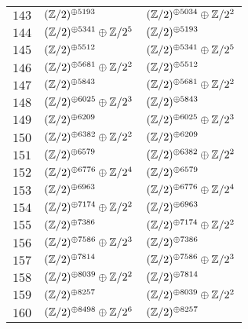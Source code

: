 \begin{supertabular}{|c|p{5.5cm}|p{5.5cm}|}
$143$%
&$(\mathbb{Z}/2)^{\oplus5193}$%
&$(\mathbb{Z}/2)^{\oplus5034}\oplus\mathbb{Z}/2^{2}$\\

$144$%
&$(\mathbb{Z}/2)^{\oplus5341}\oplus\mathbb{Z}/2^{5}$%
&$(\mathbb{Z}/2)^{\oplus5193}$\\

$145$%
&$(\mathbb{Z}/2)^{\oplus5512}$%
&$(\mathbb{Z}/2)^{\oplus5341}\oplus\mathbb{Z}/2^{5}$\\

$146$%
&$(\mathbb{Z}/2)^{\oplus5681}\oplus\mathbb{Z}/2^{2}$%
&$(\mathbb{Z}/2)^{\oplus5512}$\\

$147$%
&$(\mathbb{Z}/2)^{\oplus5843}$%
&$(\mathbb{Z}/2)^{\oplus5681}\oplus\mathbb{Z}/2^{2}$\\

$148$%
&$(\mathbb{Z}/2)^{\oplus6025}\oplus\mathbb{Z}/2^{3}$%
&$(\mathbb{Z}/2)^{\oplus5843}$\\

$149$%
&$(\mathbb{Z}/2)^{\oplus6209}$%
&$(\mathbb{Z}/2)^{\oplus6025}\oplus\mathbb{Z}/2^{3}$\\

$150$%
&$(\mathbb{Z}/2)^{\oplus6382}\oplus\mathbb{Z}/2^{2}$%
&$(\mathbb{Z}/2)^{\oplus6209}$\\

$151$%
&$(\mathbb{Z}/2)^{\oplus6579}$%
&$(\mathbb{Z}/2)^{\oplus6382}\oplus\mathbb{Z}/2^{2}$\\

$152$%
&$(\mathbb{Z}/2)^{\oplus6776}\oplus\mathbb{Z}/2^{4}$%
&$(\mathbb{Z}/2)^{\oplus6579}$\\

$153$%
&$(\mathbb{Z}/2)^{\oplus6963}$%
&$(\mathbb{Z}/2)^{\oplus6776}\oplus\mathbb{Z}/2^{4}$\\

$154$%
&$(\mathbb{Z}/2)^{\oplus7174}\oplus\mathbb{Z}/2^{2}$%
&$(\mathbb{Z}/2)^{\oplus6963}$\\

$155$%
&$(\mathbb{Z}/2)^{\oplus7386}$%
&$(\mathbb{Z}/2)^{\oplus7174}\oplus\mathbb{Z}/2^{2}$\\

$156$%
&$(\mathbb{Z}/2)^{\oplus7586}\oplus\mathbb{Z}/2^{3}$%
&$(\mathbb{Z}/2)^{\oplus7386}$\\

$157$%
&$(\mathbb{Z}/2)^{\oplus7814}$%
&$(\mathbb{Z}/2)^{\oplus7586}\oplus\mathbb{Z}/2^{3}$\\

$158$%
&$(\mathbb{Z}/2)^{\oplus8039}\oplus\mathbb{Z}/2^{2}$%
&$(\mathbb{Z}/2)^{\oplus7814}$\\

$159$%
&$(\mathbb{Z}/2)^{\oplus8257}$%
&$(\mathbb{Z}/2)^{\oplus8039}\oplus\mathbb{Z}/2^{2}$\\

$160$%
&$(\mathbb{Z}/2)^{\oplus8498}\oplus\mathbb{Z}/2^{6}$%
&$(\mathbb{Z}/2)^{\oplus8257}$\\


\end{supertabular}

